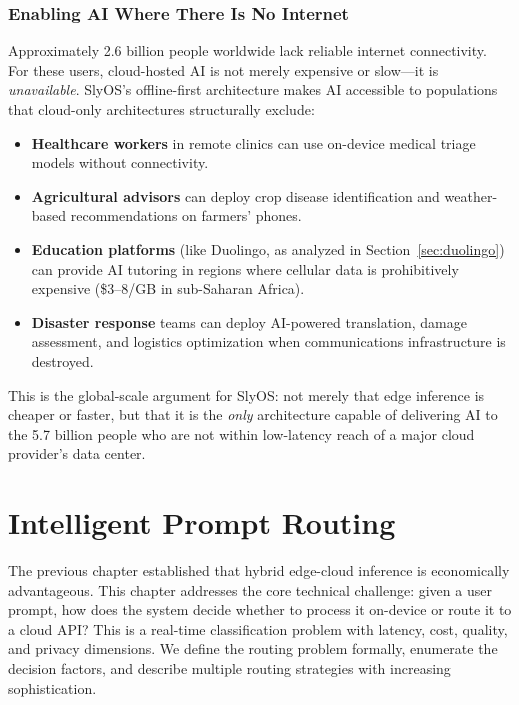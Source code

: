 \documentclass[12pt, letterpaper, twoside]{report}
\begin{document}
\subsection{Enabling AI Where There Is No Internet}

Approximately 2.6 billion people worldwide lack reliable internet connectivity. For these users, cloud-hosted AI is not merely expensive or slow---it is \textit{unavailable}. SlyOS's offline-first architecture makes AI accessible to populations that cloud-only architectures structurally exclude:

\begin{itemize}[itemsep=1pt, topsep=2pt, parsep=0pt]
\item \textbf{Healthcare workers} in remote clinics can use on-device medical triage models without connectivity.
\item \textbf{Agricultural advisors} can deploy crop disease identification and weather-based recommendations on farmers' phones.
\item \textbf{Education platforms} (like Duolingo, as analyzed in Section~\ref{sec:duolingo}) can provide AI tutoring in regions where cellular data is prohibitively expensive (\$3--8/GB in sub-Saharan Africa).
\item \textbf{Disaster response} teams can deploy AI-powered translation, damage assessment, and logistics optimization when communications infrastructure is destroyed.
\end{itemize}

This is the global-scale argument for SlyOS: not merely that edge inference is cheaper or faster, but that it is the \textit{only} architecture capable of delivering AI to the 5.7 billion people who are not within low-latency reach of a major cloud provider's data center.

\chapter{Intelligent Prompt Routing}
\label{ch:routing}

The previous chapter established that hybrid edge-cloud inference is economically advantageous. This chapter addresses the core technical challenge: given a user prompt, how does the system decide whether to process it on-device or route it to a cloud API? This is a real-time classification problem with latency, cost, quality, and privacy dimensions. We define the routing problem formally, enumerate the decision factors, and describe multiple routing strategies with increasing sophistication.
\end{document}
